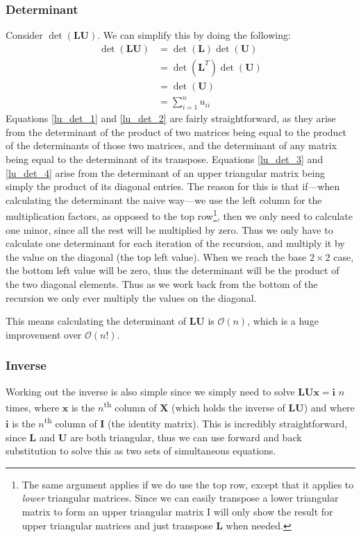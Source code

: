\documentclass[12pt]{article}
\begin{document}
\subsubsection{Determinant}
Consider $\det(\mathbf{LU})$. We can simplify this by doing the following:
\begin{align}
	\det(\mathbf{LU}) &= \det(\mathbf{L}) \det(\mathbf{U}) \label{lu_det_1} \\
	&= \det(\mathbf{L}^T) \det(\mathbf{U}) \label{lu_det_2} \\
	&= \det(\mathbf{U}) \label{lu_det_3} \\
	&= \sum_{i=1}^{n} u_{ii} \label{lu_det_4}
\end{align}
Equations \ref{lu_det_1} and \ref{lu_det_2} are fairly straightforward, as they arise from the determinant of the product of two matrices being equal to the product of the determinants of those two matrices, and the determinant of any matrix being equal to the determinant of its transpose. Equations \ref{lu_det_3} and \ref{lu_det_4}
arise from the determinant of an upper triangular matrix being simply the product of its diagonal entries. The reason for this is that if---when calculating the determinant the naive way---we use the left column for the multiplication factors, as opposed to the top row\footnote{The same argument applies if we do use the top row, except that it applies to \emph{lower} triangular matrices. Since we can easily transpose a lower triangular matrix to form an upper triangular matrix I will only show the result for upper triangular matrices and just transpose $\mathbf{L}$ when needed.}, then we only need to calculate one minor, since all the rest will be multiplied by zero. Thus we only have to calculate one determinant for each iteration of the recursion, and multiply it by the value on the diagonal (the top left value). When we reach the base $2\times2$ case, the bottom left value will be zero, thus the determinant will be the product of the two diagonal elements. Thus as we work back from the bottom of the recursion we only ever multiply the values on the diagonal.

This means calculating the determinant of $\mathbf{LU}$ is $\mathcal{O}(n)$\cite{GoluVanl96}, which is a huge improvement over $\mathcal{O}(n!)$.

\subsubsection{Inverse}
Working out the inverse is also simple since we simply need to solve $\mathbf{LUx}=\mathbf{i}$ $n$ times, where $\mathbf{x}$ is the $n$\textsuperscript{th} column of $\mathbf{X}$ (which holds the inverse of $\mathbf{LU}$) and where $\mathbf{i}$ is the $n$\textsuperscript{th} column of $\mathbf{I}$ (the identity matrix). This is incredibly straightforward, since $\mathbf{L}$ and $\mathbf{U}$ are both triangular, thus we can use forward and back substitution to solve this as two sets of simultaneous equations.
\end{document}
